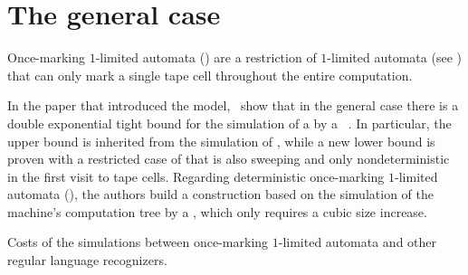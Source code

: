 \section{The general case}\label{sec:oncemarking-general}
Once-marking $1$-limited automata (\OMOLAs) are a restriction of $1$-limited automata (see ) that can only mark a single tape cell throughout the entire computation.

In the paper that introduced the model,~\citeauthor{PigPri23a} show that in the general case there is a double exponential tight bound for the simulation of a \OMOLA by a \ODFA~\cite{PigPri23a}.
In particular, the upper bound is inherited from the simulation of \OLAs, while a new lower bound is proven with a restricted case of \OMOLA that is also sweeping and only nondeterministic in the first visit to tape cells.
Regarding deterministic once-marking $1$-limited automata (\OMODLAs), the authors build a construction based on the simulation of the machine's computation tree by a \TDFA, which only requires a cubic size increase.

\begin{table}
	\centering
	\caption{Costs of the simulations between once-marking $1$-limited automata and other regular language recognizers.}
	\label{tab:sims-om-general-oncemarking}
\end{table}

